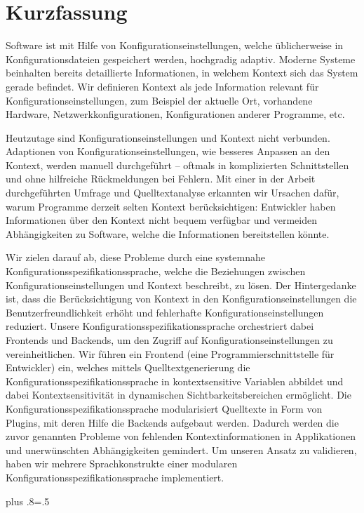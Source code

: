 \chapter{Kurzfassung}

Software ist mit Hilfe von Konfigurationseinstellungen, welche üblicherweise in Konfigurationsdateien gespeichert werden, hochgradig adaptiv.
Moderne Systeme beinhalten bereits detaillierte Informationen, in welchem Kontext sich das System gerade befindet.
Wir definieren Kontext als jede Information relevant für Konfigurationseinstellungen, zum Beispiel der aktuelle Ort, vorhandene Hardware, Netzwerkkonfigurationen, Konfigurationen anderer Programme, etc.

Heutzutage sind Konfigurationseinstellungen und Kontext nicht verbunden.
Adaptionen von Konfigurationseinstellungen, wie besseres Anpassen an den Kontext, werden manuell durchgeführt -- oftmals in komplizierten Schnittstellen und ohne hilfreiche Rückmeldungen bei Fehlern.
Mit einer in der Arbeit durchgeführten Umfrage und Quelltextanalyse erkannten wir Ursachen dafür, warum Programme derzeit selten Kontext berücksichtigen:
Entwickler haben Informationen über den Kontext nicht bequem verfügbar und vermeiden Abhängigkeiten zu Software, welche die Informationen bereitstellen könnte.

Wir zielen darauf ab, diese Probleme durch eine systemnahe Konfigurationsspezifikationssprache, welche die Beziehungen zwischen Konfigurationseinstellungen und Kontext beschreibt, zu lösen.
Der Hintergedanke ist, dass die Berücksichtigung von Kontext in den Konfigurationseinstellungen die Benutzerfreundlichkeit erhöht und fehlerhafte Konfigurationseinstellungen reduziert.
Unsere Konfigurationsspezifikationssprache orchestriert dabei Frontends und Backends, um den Zugriff auf Konfigurationseinstellungen zu vereinheitlichen.
Wir führen ein Frontend (eine Programmierschnittstelle für Entwickler) ein, welches mittels Quelltextgenerierung die Konfigurationsspezifikationssprache in kontextsensitive Variablen abbildet und dabei Kontextsensitivität in dynamischen Sichtbarkeitsbereichen ermöglicht.
Die Konfigurationsspezifikationssprache modularisiert Quelltexte in Form von Plugins, mit deren Hilfe die Backends aufgebaut werden.
Dadurch werden die zuvor genannten Probleme von fehlenden Kontextinformationen in Applikationen und unerwünschten Abhängigkeiten gemindert.
Um unseren Ansatz zu validieren, haben wir mehrere Sprachkonstrukte einer modularen Konfigurationsspezifikationssprache implementiert.%
{\parfillskip=0pt plus .8\textwidth \emergencystretch=.5\textwidth \par}


